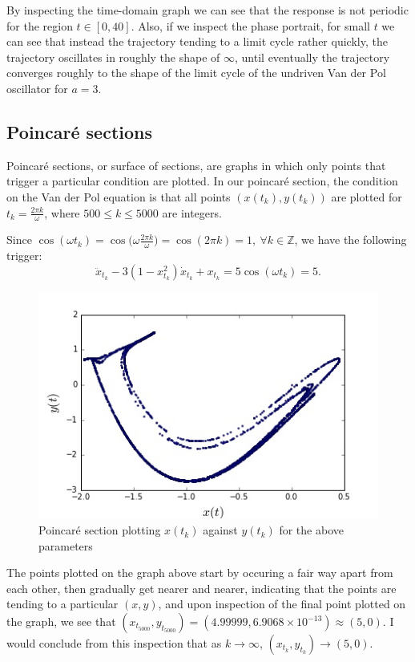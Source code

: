 \documentclass[11pt,a4paper]{amsart}
\begin{document}
By inspecting the time-domain graph we can see that the response is not periodic for the region $t\in[0,40]$. Also, if we inspect the phase portrait, for small $t$ we can see that instead the trajectory tending to a limit cycle rather quickly, the trajectory oscillates in roughly the shape of $\infty$, until eventually the trajectory converges roughly to the shape of the limit cycle of the undriven Van der Pol oscillator for $a=3$.

\subsection*{Poincar\'e sections}Poincar\'e sections, or surface of sections, are graphs in which only points that trigger a particular condition are plotted. In our poincar\'e section, the condition on the Van der Pol equation is that all points $(x(t_k),y(t_k))$ are plotted for $t_k=\frac{2\pi k}{\omega}$, where $500\leq k \leq 5000$ are integers. 

Since $\cos(\omega t_k)=\cos\big(\omega\frac{2\pi k}{\omega}\big) =\cos(2\pi k)=1,\  \forall k\in \mathbb{Z}$, we have the following trigger:
$$\ddot{x}_{t_k} -3(1-x_{t_k}^2)\dot{x}_{t_k} + x_{t_k} =5\cos(\omega t_k)=5.$$ 

\begin{figure}[h]
\caption{Poincar\'e section plotting $x(t_k)$ against $y(t_k)$ for the above parameters}
\includegraphics[scale=0.5]{part_3b.jpg}
\centering
\end{figure}

The points plotted on the graph above start by occuring a fair way apart from each other, then gradually get nearer and nearer, indicating that the points are tending to a particular $(x,y)$, and upon inspection of the final point plotted on the graph, we see that $(x_{t_{5000}},y_{t_{5000}})=(4.99999,6.9068\times 10^{-13}) \approx (5,0)$. I would conclude from this inspection that as $k\to\infty$, $(x_{t_k},y_{t_k}) \to (5,0)$.
\end{document}
